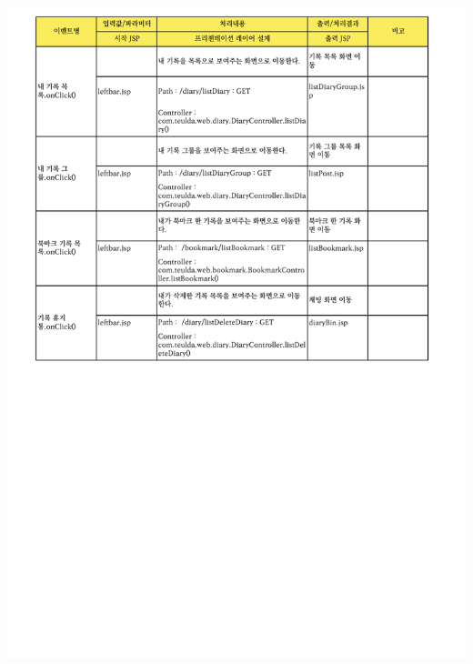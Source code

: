 {{{{{{{{{{{{{{{{{{{{{{{{{{{{{{{{{{{{{{{{{{{{\includegraphics[width=20cm]{./Figure/Design/Display/diary/diary_26.pdf} \\
}}}}}}}}}}}}}}}}}}}}}}}}}}}}}}}}}}}}}}}}}}}}
